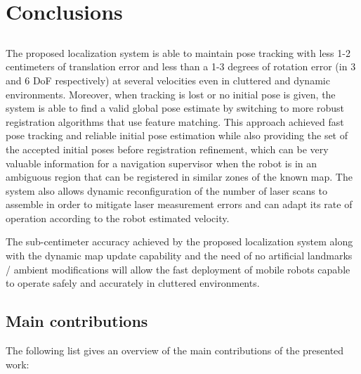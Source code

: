 \chapter{Conclusions} \label{chap:conclusions-and-future-work}



\section*{}

The proposed localization system is able to maintain pose tracking with less 1-2 centimeters of translation error and less than a 1-3 degrees of rotation error (in 3 and 6 DoF respectively) at several velocities even in cluttered and dynamic environments. Moreover, when tracking is lost or no initial pose is given, the system is able to find a valid global pose estimate by switching to more robust registration algorithms that use feature matching. This approach achieved fast pose tracking and reliable initial pose estimation while also providing the set of the accepted initial poses before registration refinement, which can be very valuable information for a navigation supervisor when the robot is in an ambiguous region that can be registered in similar zones of the known map. The system also allows dynamic reconfiguration of the number of laser scans to assemble in order to mitigate laser measurement errors and can adapt its rate of operation according to the robot estimated velocity.

The sub-centimeter accuracy achieved by the proposed localization system along with the dynamic map update capability and the need of no artificial landmarks / ambient modifications will allow the fast deployment of mobile robots capable to operate safely and accurately in cluttered environments.



\section{Main contributions}


The following list gives an overview of the main contributions of the presented work:

